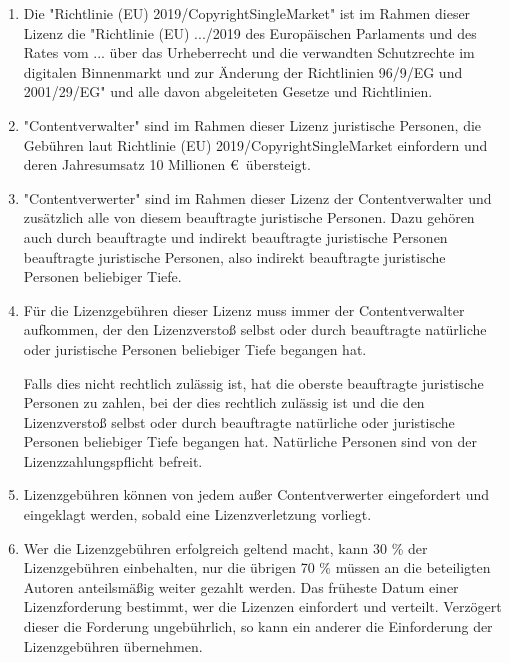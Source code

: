\documentclass[a4paper,8pt]{extarticle}
\begin{document}
\begin{enumerate}
 \item Die "Richtlinie (EU) 2019/CopyrightSingleMarket" ist im Rahmen dieser Lizenz die "Richtlinie (EU) .../2019 des Europäischen Parlaments und des Rates vom ... über das Urheberrecht und die verwandten Schutzrechte im digitalen Binnenmarkt und zur Änderung der Richtlinien 96/9/EG und 2001/29/EG" und alle davon abgeleiteten Gesetze und Richtlinien.

 
 \item "Contentverwalter" sind im Rahmen dieser Lizenz juristische Personen, die Gebühren laut Richtlinie (EU) 2019/CopyrightSingleMarket einfordern und deren Jahresumsatz 10 Millionen \euro\ übersteigt.

 \item "Contentverwerter" sind im Rahmen dieser Lizenz der Contentverwalter und zusätzlich alle von diesem beauftragte juristische Personen. Dazu gehören auch durch beauftragte und indirekt beauftragte juristische Personen beauftragte juristische Personen, also indirekt beauftragte juristische Personen beliebiger Tiefe.

 \item Für die Lizenzgebühren dieser Lizenz muss immer der Contentverwalter aufkommen, der den Lizenzverstoß selbst oder durch beauftragte natürliche oder juristische Personen beliebiger Tiefe begangen hat.
 
 Falls dies nicht rechtlich zulässig ist, hat die oberste beauftragte juristische Personen zu zahlen, bei der dies rechtlich zulässig ist und die den Lizenzverstoß selbst oder durch beauftragte natürliche oder juristische Personen beliebiger Tiefe begangen hat. Natürliche Personen sind von der Lizenzzahlungspflicht befreit.

 \item Lizenzgebühren können von jedem außer Contentverwerter eingefordert und eingeklagt werden, sobald eine Lizenzverletzung vorliegt.

 \item Wer die Lizenzgebühren erfolgreich geltend macht, kann 30 \% der Lizenzgebühren einbehalten, nur die übrigen 70 \% müssen an die beteiligten Autoren anteilsmäßig weiter gezahlt werden. Das früheste Datum einer Lizenzforderung bestimmt, wer die Lizenzen einfordert und verteilt. Verzögert dieser die Forderung ungebührlich, so kann ein anderer die Einforderung der Lizenzgebühren übernehmen.


\end{enumerate}
\end{document}
